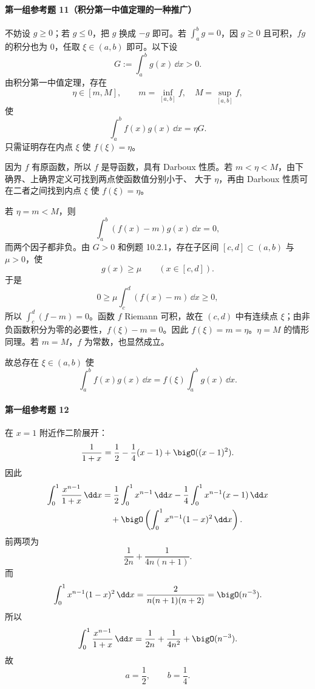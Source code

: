 \paragraph{第一组参考题 11（积分第一中值定理的一种推广）}
\begin{xsolution}
不妨设 $g\geqslant0$；若 $g\leqslant0$，把 $g$ 换成 $-g$ 即可。若 $\int_a^b g=0$，因 $g\geqslant0$ 且可积，$fg$ 的积分也为 $0$，任取 $\xi\in(a,b)$ 即可。以下设
\[
  G:=\int_a^b g(x)\,\dd x>0.
\]
由积分第一中值定理，存在
\[
  \eta\in[m,M],
  \qquad
  m=\inf_{[a,b]}f,\quad M=\sup_{[a,b]}f,
\]
使
\[
  \int_a^b f(x)g(x)\,\dd x=\eta G.
\]
只需证明存在内点 $\xi$ 使 $f(\xi)=\eta$。

因为 $f$ 有原函数，所以 $f$ 是导函数，具有 Darboux 性质。若 $m<\eta<M$，由下确界、上确界定义可找到两点使函数值分别小于、 大于 $\eta$，再由 Darboux 性质可在二者之间找到内点 $\xi$ 使 $f(\xi)=\eta$。

若 $\eta=m<M$，则
\[
  \int_a^b(f(x)-m)g(x)\,\dd x=0,
\]
而两个因子都非负。由 $G>0$ 和例题 10.2.1，存在子区间 $[c,d]\subset(a,b)$ 与 $\mu>0$，使
\[
  g(x)\geqslant\mu\qquad(x\in[c,d]).
\]
于是
\[
  0\geqslant\mu\int_c^d(f(x)-m)\,\dd x\geqslant0,
\]
所以 $\int_c^d(f-m)=0$。函数 $f$ Riemann 可积，故在 $(c,d)$ 中有连续点 $\xi$；由非负函数积分为零的必要性，$f(\xi)-m=0$。因此 $f(\xi)=m=\eta$。$\eta=M$ 的情形同理。若 $m=M$，$f$ 为常数，也显然成立。

故总存在 $\xi\in(a,b)$ 使
\[
  \boxed{\int_a^b f(x)g(x)\,\dd x
  =f(\xi)\int_a^b g(x)\,\dd x}.
\]
\end{xsolution}

\paragraph{第一组参考题 12}
\begin{xsolution}
在 $x=1$ 附近作二阶展开：
\[
  \frac1{1+x}
  =\frac12-\frac14(x-1)+\bigO((x-1)^2).
\]
因此
\begin{align*}
  \int_0^1\frac{x^{n-1}}{1+x}\,\dd x
  &=\frac12\int_0^1x^{n-1}\,\dd x
  -\frac14\int_0^1x^{n-1}(x-1)\,\dd x\\
  &\quad+\bigO\left(\int_0^1x^{n-1}(1-x)^2\,\dd x\right).
\end{align*}
前两项为
\[
  \frac1{2n}
  +\frac1{4n(n+1)}.
\]
而
\[
  \int_0^1x^{n-1}(1-x)^2\,\dd x
  =\frac{2}{n(n+1)(n+2)}=\bigO(n^{-3}).
\]
所以
\[
  \int_0^1\frac{x^{n-1}}{1+x}\,\dd x
  =\frac1{2n}+\frac1{4n^2}+\bigO(n^{-3}).
\]
故
\[
  \boxed{a=\frac12,\qquad b=\frac14}.
\]
\end{xsolution}

